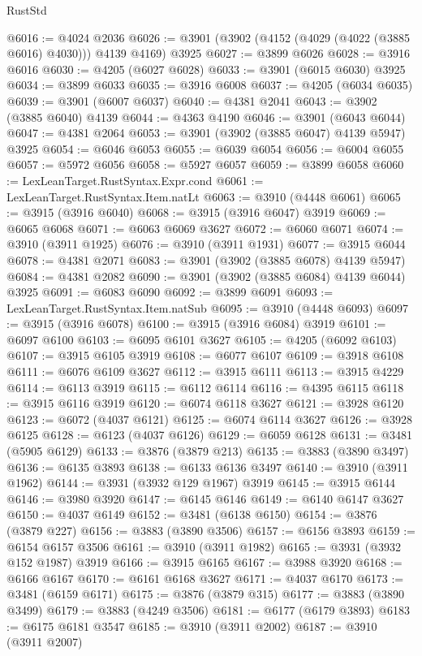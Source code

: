 \begin{lexlean}{RustStd}
\begin{coremodule}
@6016 := @4024 @2036
@6026 := @3901 (@3902 (@4152 (@4029 (@4022 (@3885 @6016) @4030))) @4139 @4169) @3925
@6027 := @3899 @6026
@6028 := @3916 @6016
@6030 := @4205 (@6027 @6028)
@6033 := @3901 (@6015 @6030) @3925
@6034 := @3899 @6033
@6035 := @3916 @6008
@6037 := @4205 (@6034 @6035)
@6039 := @3901 (@6007 @6037)
@6040 := @4381 @2041
@6043 := @3902 (@3885 @6040) @4139
@6044 := @4363 @4190
@6046 := @3901 (@6043 @6044)
@6047 := @4381 @2064
@6053 := @3901 (@3902 (@3885 @6047) @4139 @5947) @3925
@6054 := @6046 @6053
@6055 := @6039 @6054
@6056 := @6004 @6055
@6057 := @5972 @6056
@6058 := @5927 @6057
@6059 := @3899 @6058
@6060 := LexLeanTarget.RustSyntax.Expr.cond
@6061 := LexLeanTarget.RustSyntax.Item.natLt
@6063 := @3910 (@4448 @6061)
@6065 := @3915 (@3916 @6040)
@6068 := @3915 (@3916 @6047) @3919
@6069 := @6065 @6068
@6071 := @6063 @6069 @3627
@6072 := @6060 @6071
@6074 := @3910 (@3911 @1925)
@6076 := @3910 (@3911 @1931)
@6077 := @3915 @6044
@6078 := @4381 @2071
@6083 := @3901 (@3902 (@3885 @6078) @4139 @5947)
@6084 := @4381 @2082
@6090 := @3901 (@3902 (@3885 @6084) @4139 @6044) @3925
@6091 := @6083 @6090
@6092 := @3899 @6091
@6093 := LexLeanTarget.RustSyntax.Item.natSub
@6095 := @3910 (@4448 @6093)
@6097 := @3915 (@3916 @6078)
@6100 := @3915 (@3916 @6084) @3919
@6101 := @6097 @6100
@6103 := @6095 @6101 @3627
@6105 := @4205 (@6092 @6103)
@6107 := @3915 @6105 @3919
@6108 := @6077 @6107
@6109 := @3918 @6108
@6111 := @6076 @6109 @3627
@6112 := @3915 @6111
@6113 := @3915 @4229
@6114 := @6113 @3919
@6115 := @6112 @6114
@6116 := @4395 @6115
@6118 := @3915 @6116 @3919
@6120 := @6074 @6118 @3627
@6121 := @3928 @6120
@6123 := @6072 (@4037 @6121)
@6125 := @6074 @6114 @3627
@6126 := @3928 @6125
@6128 := @6123 (@4037 @6126)
@6129 := @6059 @6128
@6131 := @3481 (@5905 @6129)
@6133 := @3876 (@3879 @213)
@6135 := @3883 (@3890 @3497)
@6136 := @6135 @3893
@6138 := @6133 @6136 @3497
@6140 := @3910 (@3911 @1962)
@6144 := @3931 (@3932 @129 @1967) @3919
@6145 := @3915 @6144
@6146 := @3980 @3920
@6147 := @6145 @6146
@6149 := @6140 @6147 @3627
@6150 := @4037 @6149
@6152 := @3481 (@6138 @6150)
@6154 := @3876 (@3879 @227)
@6156 := @3883 (@3890 @3506)
@6157 := @6156 @3893
@6159 := @6154 @6157 @3506
@6161 := @3910 (@3911 @1982)
@6165 := @3931 (@3932 @152 @1987) @3919
@6166 := @3915 @6165
@6167 := @3988 @3920
@6168 := @6166 @6167
@6170 := @6161 @6168 @3627
@6171 := @4037 @6170
@6173 := @3481 (@6159 @6171)
@6175 := @3876 (@3879 @315)
@6177 := @3883 (@3890 @3499)
@6179 := @3883 (@4249 @3506)
@6181 := @6177 (@6179 @3893)
@6183 := @6175 @6181 @3547
@6185 := @3910 (@3911 @2002)
@6187 := @3910 (@3911 @2007)

\end{coremodule}
\end{lexlean}
